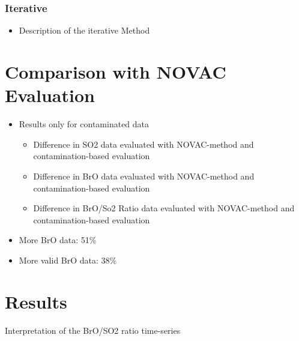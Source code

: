 \documentclass  [
  paper    = a4,
  BCOR     = 10mm,
  twoside,
  fontsize = 12pt,
  fleqn,
  toc      = bibnumbered,
  toc      = listofnumbered,
  numbers  = noendperiod,
  headings = normal,
  listof   = leveldown,
  version  = 3.03
]                                       {scrreprt}
\begin{document}
	\subsection{Iterative}
	\begin{itemize}
		\item Description of the iterative Method
	\end{itemize}
	\chapter{Comparison with NOVAC Evaluation}
	\begin{itemize}
		\item Results only for contaminated data
		\begin{itemize}
			\item Difference in SO2 data evaluated with NOVAC-method and contamination-based evaluation
			\item Difference in BrO data evaluated with NOVAC-method and contamination-based evaluation
			\item Difference in BrO/So2 Ratio data evaluated with NOVAC-method and contamination-based evaluation
		\end{itemize}
		\item More BrO data: 51\%
		\item  More valid BrO data: 38\%
	\end{itemize}
	\chapter{Results}
	Interpretation of the BrO/SO2 ratio time-series
\end{document}
